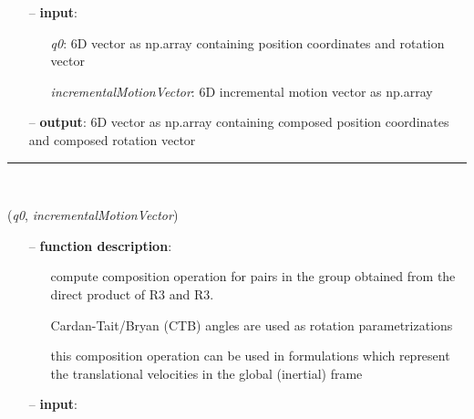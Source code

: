 \begin{itemize}[leftmargin=1.4cm]
\begin{itemize}[leftmargin=0.5cm]
\begin{itemize}[leftmargin=1.4cm]
\begin{itemize}[leftmargin=1.4cm]
\begin{itemize}[leftmargin=0.5cm]
\begin{itemize}[leftmargin=1.4cm]
\begin{itemize}[leftmargin=0.5cm]
\begin{itemize}[leftmargin=1.4cm]
\begin{itemize}[leftmargin=1.4cm]
\begin{itemize}[leftmargin=1.4cm]
\begin{itemize}[leftmargin=1.4cm]
\begin{itemize}[leftmargin=0.5cm]
\begin{itemize}[leftmargin=0.7cm]
\begin{itemize}[leftmargin=1.2cm]
    \item[]             this composition operation can be used in formulations which represent the translational velocities in the local (body-attached) frame
  \end{itemize}
  \item[--]  {\bf input}: \vspace{-6pt}
  \begin{itemize}[leftmargin=1.2cm]
\setlength{\itemindent}{-0.7cm}
    \item[] {\it q0}: 6D vector as np.array containing position coordinates and rotation vector
    \item[] {\it   incrementalMotionVector}: 6D incremental motion vector as np.array
  \end{itemize}
  \item[--]  {\bf output}: 6D vector as np.array containing composed position coordinates and composed rotation vector\vspace{12pt}\end{itemize}
%
\noindent\rule{8cm}{0.75pt}\vspace{1pt} \\ 
\begin{flushleft}
\label{sec:lieGroupBasics:CompositionRuleDirectProductR3AndR3RotXYZAngles}
({\it q0}, {\it incrementalMotionVector})
\end{flushleft}
\setlength{\itemindent}{0.7cm}
\begin{itemize}[leftmargin=0.7cm]
  \item[--]  {\bf function description}: \vspace{-6pt}
  \begin{itemize}[leftmargin=1.2cm]
\setlength{\itemindent}{-0.7cm}
    \item[] compute composition operation for pairs in the group obtained from the direct product of R3 and R3.
    \item[]             Cardan-Tait/Bryan (CTB) angles are used as rotation parametrizations
    \item[]             this composition operation can be used in formulations which represent the translational velocities in the global (inertial) frame
  \end{itemize}
  \item[--]  {\bf input}: \vspace{-6pt}

\end{itemize}
\end{itemize}
\end{itemize}
\end{itemize}
\end{itemize}
\end{itemize}
\end{itemize}
\end{itemize}
\end{itemize}
\end{itemize}
\end{itemize}
\end{itemize}
\end{itemize}
